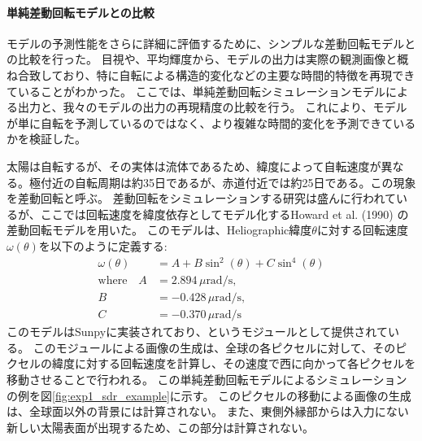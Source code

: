         \paragraph{単純差動回転モデルとの比較}
          モデルの予測性能をさらに詳細に評価するために、シンプルな差動回転モデルとの比較を行った。
          目視や、平均輝度から、モデルの出力は実際の観測画像と概ね合致しており、特に自転による構造的変化などの主要な時間的特徴を再現できていることがわかった。
          ここでは、単純差動回転シミュレーションモデルによる出力と、我々のモデルの出力の再現精度の比較を行う。
          これにより、モデルが単に自転を予測しているのではなく、より複雑な時間的変化を予測できているかを検証した。

          太陽は自転するが、その実体は流体であるため、緯度によって自転速度が異なる。極付近の自転周期は約35日であるが、赤道付近では約25日である。この現象を差動回転と呼ぶ。
          差動回転をシミュレーションする研究は盛んに行われているが、ここでは回転速度を緯度依存としてモデル化するHoward et al. (1990) \cite{howard1990solar}の差動回転モデルを用いた。
          このモデルは、Heliographic緯度\(\theta\)に対する回転速度\(\omega(\theta)\)を以下のように定義する:
          \begin{align}
            \omega(\theta) &= A + B \sin^{2}(\theta) + C \sin^{4}(\theta) \\
            \text{where} \quad A &= 2.894 \, \mu\text{rad/s}, \\
            B &= -0.428 \, \mu\text{rad/s}, \\
            C &= -0.370 \, \mu\text{rad/s}
          \end{align}
          このモデルはSunpyに実装されており、というモジュールとして提供されている。
          このモジュールによる画像の生成は、全球の各ピクセルに対して、そのピクセルの緯度に対する回転速度を計算し、その速度で西に向かって各ピクセルを移動させることで行われる。
          この単純差動回転モデルによるシミュレーションの例を図\ref{fig:exp1_sdr_example}に示す。
          このピクセルの移動による画像の生成は、全球面以外の背景には計算されない。
          また、東側外縁部からは入力にない新しい太陽表面が出現するため、この部分は計算されない。

